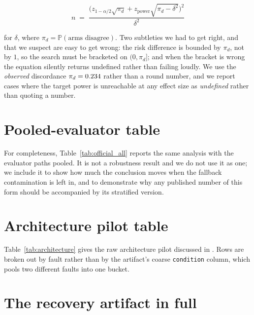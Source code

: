 \begin{equation}
  n \;=\; \frac{\bigl(z_{1-\alpha/2}\sqrt{\pi_d}
        + z_{\text{power}}\sqrt{\pi_d - \delta^2}\bigr)^2}{\delta^2}
\end{equation}

for $\delta$, where $\pi_d = \mathbb{P}(\text{arms disagree})$. Two subtleties we
had to get right, and that we suspect are easy to get wrong: the risk difference
is bounded by $\pi_d$, not by $1$, so the search must be bracketed on
$(0, \pi_d]$; and when the bracket is wrong the equation silently returns
undefined rather than failing loudly. We use the \emph{observed} discordance
$\pi_d = 0.234{}$ rather than a round number, and we report cases where the
target power is unreachable at any effect size as \emph{undefined} rather than
quoting a number.



\section{Pooled-evaluator table}
\label{app:pooled}

For completeness, Table~\ref{tab:official_all} reports the same analysis with the
evaluator paths pooled. It is not a robustness result and we do not use it as one;
we include it to show how much the conclusion moves when the fallback
contamination is left in, and to demonstrate why any published number of this form
should be accompanied by its stratified version.



\section{Architecture pilot table}
\label{app:arch}

Table~\ref{tab:architecture} gives the raw architecture pilot discussed in
. Rows are broken out by fault rather than by the artifact's
coarse \texttt{condition} column, which pools two different faults into one
bucket.



\section{The recovery artifact in full}
\label{app:recovery}

